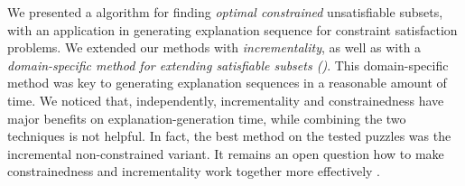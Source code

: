 We presented a \hitsetbased algorithm for finding \textit{optimal constrained} unsatisfiable subsets, with an application in generating explanation sequence for constraint satisfaction problems.
We extended our methods with \emph{incrementality}, as well as with a \emph{domain-specific method for extending satisfiable subsets (\grow)}. 
This domain-specific \grow method was key to generating explanation sequences in a reasonable amount of time.
We noticed that, independently, incrementality and constrainedness have major benefits on explanation-generation time, while combining the two techniques is not helpful. In fact, the best method on the tested puzzles was the incremental non-constrained variant. 
It remains an open question how to make constrainedness and incrementality work together more effectively .




